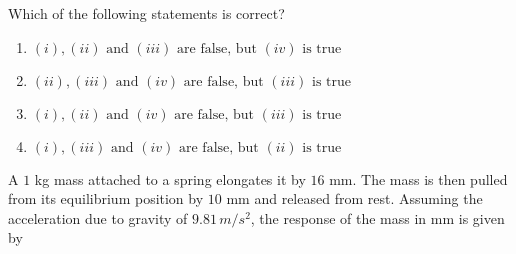 Which of the following statements is correct?
    \begin{enumerate}
        \item $ (i), (ii) \text{ and } (iii) \text{ are false, but } (iv) \text{ is true} $
        \item $ (ii), (iii) \text{ and } (iv) \text{ are false, but } (iii) \text{ is true} $
        \item $ (i), (ii) \text{ and } (iv) \text{ are false, but } (iii) \text{ is true} $
        \item $ (i), (iii) \text{ and } (iv) \text{ are false, but } (ii) \text{ is true} $
    \end{enumerate}
\bigskip
\item A $1$ kg mass attached to a spring elongates it by $16$ mm. The mass is then pulled from its equilibrium position by $10$ mm and released from rest. Assuming the acceleration due to gravity of $9.81 \, m/s^2$, the response of the mass in mm is given by

